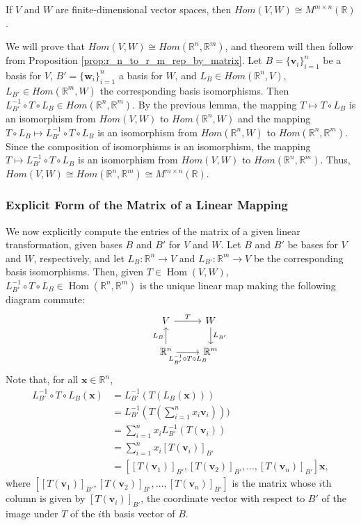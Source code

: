 \documentclass[12pt,letterpaper,reqno]{article}
\numberwithin{equation}{section}
\newcommand{\R}{\ensuremath{\mathbb R}}
\newcommand{\bv}{\mathbf{v}}
\newcommand{\bw}{\mathbf{w}}
\newcommand{\bx}{\mathbf{x}}
\DeclareMathOperator{\Hom}{Hom}
\begin{document}
\begin{thm}
	If $V$ and $W$ are finite-dimensional vector spaces, then $Hom(V,W) \cong  M^{m \times n}(\mathbb{R})$.
\end{thm}

\begin{pf}
	We will prove that $Hom(V,W) \cong Hom(\mathbb{R}^n, \mathbb{R}^m)$, and theorem will then follow from Proposition \ref{prop:r_n_to_r_m_rep_by_matrix}. Let $B=\{\bv_i\}_{i=1}^n$ be a basis for $V$, $B'=\{\bw_i\}_{i=1}^n$ a basis for $W$, and $L_B \in Hom(\mathbb{R}^n,V)$, $L_{B'} \in Hom(\mathbb{R}^m,W)$ the corresponding basis isomorphisms. Then $L_{B'}^{-1} \circ T \circ L_B \in Hom(\mathbb{R}^n,\mathbb{R}^m)$. By the previous lemma, the mapping $T \mapsto T \circ L_B$ is an isomorphism from $Hom(V,W)$ to $Hom(\mathbb{R}^n,W)$ and the mapping $T \circ L_B \mapsto L_{B'}^{-1} \circ T \circ L_B$ is an isomorphism from $Hom(\mathbb{R}^n,W)$ to $Hom(\mathbb{R}^n,\mathbb{R}^m)$. Since the composition of isomorphisms is an isomorphism, the mapping $T \mapsto L_{B'}^{-1} \circ T \circ L_B$ is an isomorphism from $Hom(V,W)$ to $Hom(\mathbb{R}^n,\mathbb{R}^m)$. Thus, $Hom(V,W)\cong Hom(\mathbb{R}^n,\mathbb{R}^m) \cong M^{m \times n}(\R)$.
\end{pf}
\subsubsection{Explicit Form of the Matrix of a Linear Mapping}
We now explicitly compute the entries of the matrix of a given linear transformation, given bases $B$ and $B'$ for $V$ and $W$. Let $B$ and $B'$ be bases for $V$ and $W$, respectively, and let $L_B:\R^n \to V$ and  $L_{B'}:\R^m \to V$ be the corresponding basis isomorphisms. Then, given $T \in \Hom(V,W)$, $L_{B'}^{-1} \circ T \circ L_B \in \Hom(\R^n,\R^m)$ is the unique linear map making the following diagram commute:
\begin{equation*}
	\begin{tikzcd}
	& V  \arrow[r,"T"] & W\\
	& \R^n  \arrow[u,"L_B"]  \arrow[r,swap,"L_{B'}^{-1} \circ T \circ L_B"] &  \R^m \arrow[u,leftarrow,swap,"L_{B'}"]	
	\end{tikzcd}
\end{equation*}
Note that, for all $\bx \in \R^n$,
\begin{align*}
	L_{B'}^{-1} \circ T \circ L_B(\bx)&=L_{B'}^{-1}(T(L_B(\bx))) \\
	&=L_{B'}^{-1}(T(\sum_{i=1}^nx_i\bv_i))) \\
	&=\sum_{i=1}^nx_iL_{B'}^{-1}(T(\bv_i)) \\
	&=\sum_{i=1}^nx_i[T(\bv_i)]_{B'} \\
	&=[[T(\bv_1)]_{B'}, [T(\bv_2)]_{B'},\dots, [T(\bv_n)]_{B'}]\bx,
\end{align*}
where $[[T(\bv_1)]_{B'}, [T(\bv_2)]_{B'},\dots, [T(\bv_n)]_{B'}]$ is the matrix whose $i$th column is given by $[T(\bv_i)]_{B'}$, the coordinate vector with respect to $B'$ of the image under $T$ of the $i$th basis vector of $B$.
\end{document}
